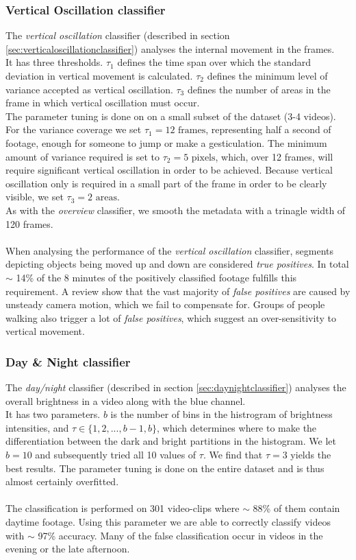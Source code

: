 \subsubsection{Vertical Oscillation classifier}
%
The \textit{vertical oscillation} classifier (described in section \ref{sec:verticaloscillationclassifier}) analyses the internal movement in the frames.\\
It has three thresholds. $\tau_1$ defines the time span over which the standard deviation in vertical movement is calculated. $\tau_2$ defines the minimum level of variance accepted as vertical oscillation. $\tau_3$ defines the number of areas in the frame in which vertical oscillation must occur.\\
The parameter tuning is done on on a small subset of the dataset (3-4 videos). For the variance coverage we set $\tau_1 = 12 \text{ frames}$, representing half a second of footage, enough for someone to jump or make a gesticulation. The minimum amount of variance required is set to $\tau_2 = 5 \text{ pixels}$, which, over 12 frames, will require significant vertical oscillation in order to be achieved. Because vertical oscillation only is required in a small part of the frame in order to be clearly visible, we set $\tau_3 = 2 \text{ areas}$.\\
As with the \textit{overview} classifier, we smooth the metadata with a trinagle width of 120 frames.\\
\\
When analysing the performance of the \textit{vertical oscillation} classifier, segments depicting objects being moved up and down are considered \textit{true positives}. In total $\sim$ 14\% of the 8 minutes of the positively classified footage fulfills this requirement. A review show that the vast majority of \textit{false positives} are caused by unsteady camera motion, which we fail to compensate for. Groups of people walking also trigger a lot of \textit{false positives}, which suggest an over-sensitivity to vertical movement.
%
\subsubsection{Day \& Night classifier}
%
The \textit{day/night} classifier (described in section \ref{sec:daynightclassifier}) analyses the overall brightness in a video along with the blue channel.\\
It has two parameters. $b$ is the number of bins in the histrogram of brightness intensities, and $\tau \in \{1,2,...,b-1,b\}$, which determines where to make the differentiation between the dark and bright partitions in the histogram. We let $b = 10$ and subsequently tried all 10 values of $\tau$. We find that $\tau = 3$ yields the best results. The parameter tuning is done on the entire dataset and is thus almost certainly overfitted.\\
\\
The classification is performed on 301 video-clips where $\sim$ 88\% of them contain daytime footage. Using this parameter we are able to correctly classify videos with $\sim$ 97\% accuracy. Many of the false classification occur in videos in the evening or the late afternoon.
%
